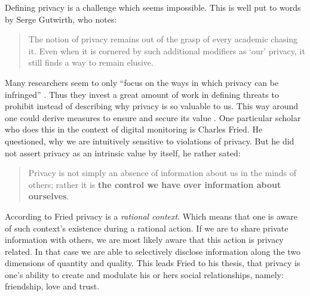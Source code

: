 \documentclass[runningheads,a4paper]{llncs}
\newenvironment{LGContent-Hidden}{ \comment  }{ }
\begin{document}
\begin{LGContent-Hidden}
Defining privacy is a challenge which seems impossible. This is well put to words by Serge Gutwirth, who notes:

\begin{quote}
The notion of privacy remains out of the grasp of every academic chasing it. Even when it is cornered by such additional modifiers as `our' privacy, it still finds a way to remain elusive. \cite{Gutwirth}
\end{quote}


Many researchers seem to only ``focus on the ways in which privacy can be infringed'' \cite{7ToP}.
Thus they invest a great amount of work in defining threats to prohibit instead of describing why privacy is so valuable to us.
This way around one could derive measures to ensure and secure its value \cite{7ToP}.
One particular scholar who does this in the context of digital monitoring is Charles Fried.
He questioned, why we are intuitively sensitive to violations of privacy.
But he did not assert privacy as an intrinsic value by itself, he rather sated:

\begin{quote}
Privacy is not simply an absence of information about us in the minds of others;
rather it is \textbf{the control we have over information about ourselves}. \cite{CFried:Privacy}
\end{quote}

According to Fried privacy is a \textit{rational context}.
Which means that one is aware of such context's existence during a rational action.
If we are to share private information with others, we are most likely aware that this action is privacy related.
In that case we are able to selectively disclose information along the two dimensions of quantity and quality.
This leads Fried to his thesis, that privacy is one's ability to create and modulate his or hers social relationships, namely: friendship, love and trust. \cite{CFried:Privacy}


\end{LGContent-Hidden}
\end{document}
